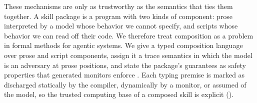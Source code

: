 \documentclass[11pt]{article}
\theoremstyle{definition}
\theoremstyle{plain}
\begin{document}
These mechanisms are only as trustworthy as the semantics that ties them together. A skill package is a program with two kinds of component: prose interpreted by a model whose behavior we cannot specify, and scripts whose behavior we can read off their code. We therefore treat composition as a problem in formal methods for agentic systems. We give a typed composition language over prose and script components, assign it a trace semantics in which the model is an adversary at prose positions, and state the package's guarantees as safety properties that generated monitors enforce \citep{alpern1985defining,schneider2000enforceable}. Each typing premise is marked as discharged statically by the compiler, dynamically by a monitor, or assumed of the model, so the trusted computing base of a composed skill is explicit ().
\end{document}
